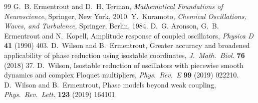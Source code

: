 \documentclass[11pt,a4paper]{article}
\begin{document}
\begin{thebibliography}{99}
 G.~B. Ermentrout and D.~H. Terman, \emph{Mathematical Foundations of Neuroscience}, Springer, New York, 2010.
 Y.~Kuramoto, \emph{Chemical Oscillations, Waves, and Turbulence}, Springer, Berlin, 1984.
 D.~G. Aronson, G.~B. Ermentrout and N.~Kopell, Amplitude response of coupled oscillators, \emph{Physica D} \textbf{41} (1990) 403.
 D.~Wilson and B.~Ermentrout, Greater accuracy and broadened applicability of phase reduction using isostable coordinates, \emph{J.\ Math.\ Biol.} \textbf{76} (2018) 37.
 D.~Wilson, Isostable reduction of oscillators with piecewise smooth dynamics and complex Floquet multipliers, \emph{Phys.\ Rev.\ E} \textbf{99} (2019) 022210.
 D.~Wilson and B.~Ermentrout, Phase models beyond weak coupling, \emph{Phys.\ Rev.\ Lett.} \textbf{123} (2019) 164101.
\end{thebibliography}
\end{document}
